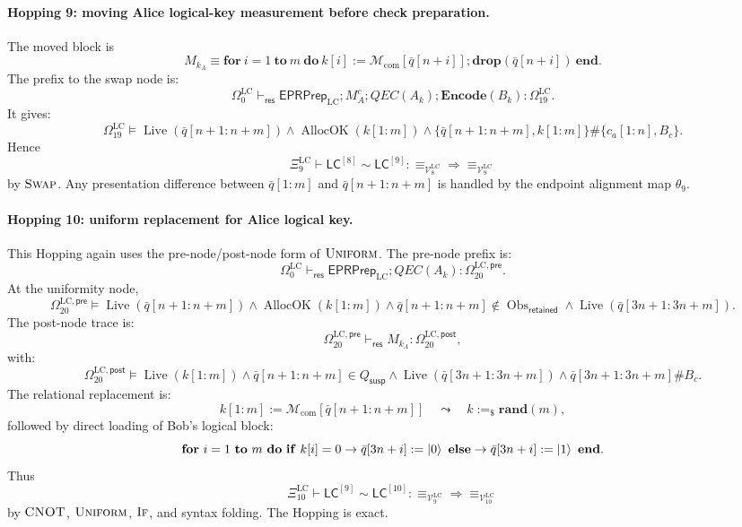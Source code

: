 \documentclass{report}
\theoremstyle{defn_style}
\providecommand{\Live}{\operatorname{Live}}
\providecommand{\AllocOK}{\operatorname{AllocOK}}
\providecommand{\Obs}{\operatorname{Obs}}
\providecommand{\HopLC}[1]{\mathsf{LC}^{[#1]}}
\begin{document}
\paragraph{Hopping 9: moving Alice logical-key measurement before check preparation.}
The moved block is
\[
M_{k_A}
\equiv
\mathbf{for}\ i=1\ \mathbf{to}\ m\ \mathbf{do}\ 
k[i]:=\mathcal M_{\mathrm{com}}[\bar q[n+i]];
\mathbf{drop}(\bar q[n+i])
\ \mathbf{end}.
\]
The prefix to the swap node is:
\[
\Omega^{\mathrm{LC}}_0
\vdash_{\mathsf{res}}
\mathsf{EPRPrep}_{\mathrm{LC}};
M_A^c;
QEC(A_k);
\mathbf{Encode}(B_k)
:
\Omega^{\mathrm{LC}}_{19}.
\tag{LC-H9-Prefix}\label{LC-H9-Prefix}
\]
It gives:
\[
\Omega^{\mathrm{LC}}_{19}
\models
\Live(\bar q[n+1{:}n+m])
\land
\AllocOK(k[1{:}m])
\land
\{\bar q[n+1{:}n+m],k[1{:}m]\}\#
\{c_a[1{:}n],B_c\}.
\tag{LC-H9-SwapReq}
\]
Hence
\[
\Xi^{\mathrm{LC}}_9
\vdash
\HopLC{8}\sim\HopLC{9}:
\equiv_{\mathcal V^{\mathrm{LC}}_8}
\Longrightarrow
\equiv_{\mathcal V^{\mathrm{LC}}_9}
\tag{LC-H9-Rel}
\]
by \(\textsc{Swap}\).  Any presentation difference between
\(\bar q[1{:}m]\) and \(\bar q[n+1{:}n+m]\) is handled by the endpoint alignment
map \(\theta_9\).

\paragraph{Hopping 10: uniform replacement for Alice logical key.}
This Hopping again uses the pre-node/post-node form of
\(\textsc{Uniform}\).  The pre-node prefix is:
\[
\Omega^{\mathrm{LC}}_0
\vdash_{\mathsf{res}}
\mathsf{EPRPrep}_{\mathrm{LC}};
QEC(A_k)
:
\Omega^{\mathrm{LC},\mathsf{pre}}_{20}.
\tag{LC-H10-UniformPreRun}\label{LC-H10-UniformPreRun}
\]
At the uniformity node,
\[
\Omega^{\mathrm{LC},\mathsf{pre}}_{20}
\models
\Live(\bar q[n+1{:}n+m])
\land
\AllocOK(k[1{:}m])
\land
\bar q[n+1{:}n+m]\notin\Obs_{\mathsf{retained}}
\land
\Live(\bar q[3n+1{:}3n+m]).
\tag{LC-H10-UniformPreReq}
\]
The post-node trace is:
\[
\Omega^{\mathrm{LC},\mathsf{pre}}_{20}
\vdash_{\mathsf{res}}
M_{k_A}
:
\Omega^{\mathrm{LC},\mathsf{post}}_{20},
\tag{LC-H10-UniformPostRun}\label{LC-H10-UniformPostRun}
\]
with:
\[
\Omega^{\mathrm{LC},\mathsf{post}}_{20}
\models
\Live(k[1{:}m])
\land
\bar q[n+1{:}n+m]\in Q_{\mathsf{susp}}
\land
\Live(\bar q[3n+1{:}3n+m])
\land
\bar q[3n+1{:}3n+m]\#B_c.
\tag{LC-H10-UniformPostReq}
\]
The relational replacement is:
\[
k[1{:}m]:=\mathcal M_{\mathrm{com}}[\bar q[n+1{:}n+m]]
\quad\leadsto\quad
k:=_\$\mathbf{rand}(m),
\]
followed by direct loading of Bob's logical block:
\[
\mathbf{for}\ i=1\ \mathbf{to}\ m\ \mathbf{do}\ 
\mathbf{if}\ k[i]=0\rightarrow \bar q[3n+i]:=\ket0
\ \mathbf{else}\rightarrow \bar q[3n+i]:=\ket1
\ \mathbf{end}.
\]
Thus
\[
\Xi^{\mathrm{LC}}_{10}
\vdash
\HopLC{9}\sim\HopLC{10}:
\equiv_{\mathcal V^{\mathrm{LC}}_9}
\Longrightarrow
\equiv_{\mathcal V^{\mathrm{LC}}_{10}}
\tag{LC-H10-Rel}
\]
by \(\textsc{CNOT}\), \(\textsc{Uniform}\), \(\textsc{If}\), and syntax
folding.  The Hopping is exact.
\end{document}
